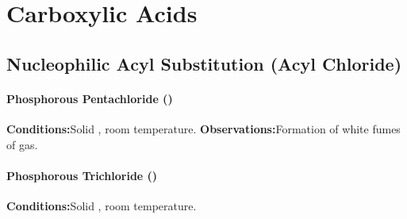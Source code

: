 










	\pagebreak
	\section{Carboxylic Acids}

		\subsection{Nucleophilic Acyl Substitution (Acyl Chloride)}

			\paragraph{Phosphorous Pentachloride ()}

			\vspace{1.5em}
			\vbox{\textbf{Conditions:}\tabto{35mm}Solid , room temperature.}
			\vbox{\textbf{Observations:}\tabto{35mm}Formation of white fumes of  gas.}



			\paragraph{Phosphorous Trichloride ()}

			\vspace{1.5em}
			\vbox{\textbf{Conditions:}\tabto{35mm}Solid , room temperature.}

